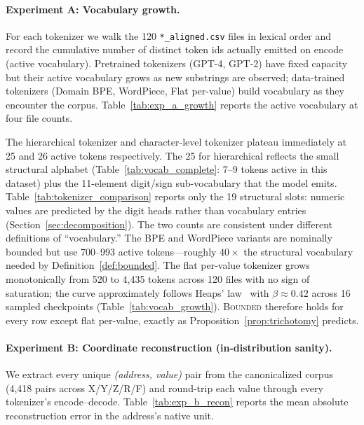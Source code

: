 \documentclass[11pt]{article}
\begin{document}
\paragraph{Experiment A: Vocabulary growth.}
For each tokenizer we walk the 120 \texttt{*\_aligned.csv} files in lexical order and record the cumulative number of distinct token ids actually emitted on encode (active vocabulary). Pretrained tokenizers (GPT-4, GPT-2) have fixed capacity but their active vocabulary grows as new substrings are observed; data-trained tokenizers (Domain BPE, WordPiece, Flat per-value) build vocabulary as they encounter the corpus. Table~\ref{tab:exp_a_growth} reports the active vocabulary at four file counts.



The hierarchical tokenizer and character-level tokenizer plateau immediately at 25 and 26 active tokens respectively. The 25 for hierarchical reflects the small structural alphabet (Table~\ref{tab:vocab_complete}: 7--9 tokens active in this dataset) plus the 11-element digit/sign sub-vocabulary that the model emits. Table~\ref{tab:tokenizer_comparison} reports only the 19 structural slots: numeric values are predicted by the digit heads rather than vocabulary entries (Section~\ref{sec:decomposition}). The two counts are consistent under different definitions of ``vocabulary.'' The BPE and WordPiece variants are nominally bounded but use 700--993 active tokens---roughly $40\times$ the structural vocabulary needed by Definition~\ref{def:bounded}. The flat per-value tokenizer grows monotonically from 520 to 4{,}435 tokens across 120 files with no sign of saturation; the curve approximately follows Heaps' law~\cite{heaps1978} with $\beta \approx 0.42$ across 16 sampled checkpoints (Table~\ref{tab:vocab_growth}). \textsc{Bounded} therefore holds for every row except flat per-value, exactly as Proposition~\ref{prop:trichotomy} predicts.

\paragraph{Experiment B: Coordinate reconstruction (in-distribution sanity).}
We extract every unique \emph{(address, value)} pair from the canonicalized corpus (4{,}418 pairs across X/Y/Z/R/F) and round-trip each value through every tokenizer's encode--decode. Table~\ref{tab:exp_b_recon} reports the mean absolute reconstruction error in the address's native unit.


\end{document}
